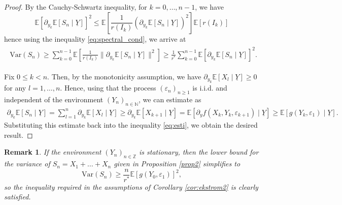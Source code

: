 \documentclass[a4paper,10pt]{article}
\newtheorem{remark}[theorem]{Remark}
\newcommand{\N}{\mathbb{N}}
\newcommand{\Z}{\mathbb{Z}}
\newcommand{\E}{\mathbb{E}}
\newcommand{\eps}{\varepsilon}
\newcommand{\var}{\mathrm{Var}}
\newcommand{\ul}[1]{\underline{#1}}
\begin{document}
\begin{proof}
	
By the Cauchy-Schwartz inequality, for $k=0,\ldots,n-1$, we have
$$
\E \left[\partial_{y_k}\E \left[S_n\mid \ul{Y}\right]\right]^2
\le \E \left[\frac{1}{r (I_k)}\left(\partial_{y_k}\E \left[S_n\mid \ul{Y}\right]\right)^2\right] \E [r (I_k)]
$$
hence using the inequality \eqref{eq:spectral_cond}, we arrive at
\begin{align}\label{eq:esti}
	\begin{split}
	\var (S_n) \ge \sum_{k=0}^{n-1} \E \left[\frac{1}{r (I_k)}\lVert\partial_{y_k}\E \left[S_n\mid \ul{Y}\right]\rVert^2\right]\ge \frac{1}{r^*}\sum_{k=0}^{n-1}\E \left[\partial_{y_k}\E \left[S_n\mid \ul{Y}\right]\right]^2. 
\end{split}
\end{align}
	
Fix $0 \le k < n$. Then, by the monotonicity assumption, we have $\partial_{y_k} \E \left[X_l \mid \ul{Y} \right] \ge 0$ for any $l = 1, \ldots, n$. Hence, using that the process $(\eps_n)_{n \ge 1}$ is i.i.d. and independent of the environment $(Y_n)_{n \in \N}$, we can estimate as
\begin{align*}
	\partial_{y_k}\E \left[S_n\mid \ul{Y}\right] =
	\sum_{l=1}^n \partial_{y_k}\E \left[X_l\mid \ul{Y}\right]
	\ge \partial_{y_k}\E \left[X_{k+1}\mid \ul{Y}\right]
	= \E \left[\partial_y f(X_{k},Y_k,\eps_{k+1})\mid \ul{Y}\right]
	\ge \E [g(Y_k,\eps_1)\mid \ul{Y}].
\end{align*}
Substituting this estimate back into the inequality \eqref{eq:esti}, we obtain the desired result.

\end{proof}

\begin{remark}
If the environment $(Y_n)_{n \in \Z}$ is stationary, then the lower bound for the variance of $S_n = X_1 + \ldots + X_n$ given in Proposition \ref{prop2} simplifies to
\[
\var(S_n) \ge \frac{n}{r^*} \E \left[g(Y_0, \eps_1)\right]^2,
\]
so the inequality required in the assumptions of Corollary \ref{cor:ekstrom2} is clearly satisfied.
\end{remark}
\end{document}
